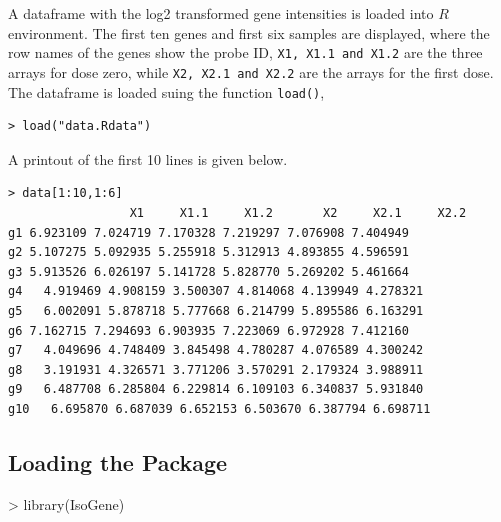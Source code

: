 \documentclass[10pt]{mybook4}
\newenvironment{boxit}{\begin{lrbox}{\savepar}
\begin{minipage}[b]{5.0in}}
{\end{minipage}\end{lrbox}\fbox{\usebox{\savepar}}}
\begin{document}
A dataframe with the log2 transformed gene intensities is loaded
into $R$ environment. The first ten genes and first six samples are
displayed, where the row names of the genes show the probe ID,
\texttt{X1, X1.1 and X1.2} are the three arrays for dose zero, while
\texttt{X2, X2.1 and X2.2} are the arrays for the first dose. The dataframe is loaded suing the function \texttt{load()},
\begin{center}
\begin{boxit}
\begin{verbatim}
> load("data.Rdata")
\end{verbatim}
\end{boxit}
\end{center}
A printout of the first 10 lines is given below.
\begin{center}
\begin{boxit}
\begin{verbatim}
> data[1:10,1:6]
                 X1     X1.1     X1.2       X2     X2.1     X2.2
g1 6.923109 7.024719 7.170328 7.219297 7.076908 7.404949
g2 5.107275 5.092935 5.255918 5.312913 4.893855 4.596591
g3 5.913526 6.026197 5.141728 5.828770 5.269202 5.461664
g4   4.919469 4.908159 3.500307 4.814068 4.139949 4.278321
g5   6.002091 5.878718 5.777668 6.214799 5.895586 6.163291
g6 7.162715 7.294693 6.903935 7.223069 6.972928 7.412160
g7   4.049696 4.748409 3.845498 4.780287 4.076589 4.300242
g8   3.191931 4.326571 3.771206 3.570291 2.179324 3.988911
g9   6.487708 6.285804 6.229814 6.109103 6.340837 5.931840
g10   6.695870 6.687039 6.652153 6.503670 6.387794 6.698711
\end{verbatim}
\end{boxit}
\end{center}

\subsection{Loading the Package}


\begin{Schunk}
\begin{Sinput}
> library(IsoGene)
\end{Sinput}
\end{Schunk}
\end{document}
